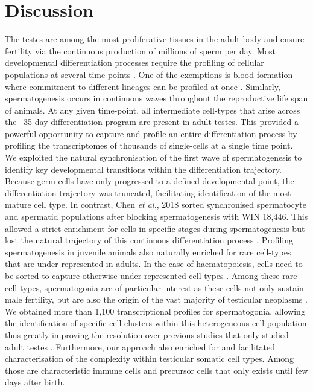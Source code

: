 
\section{Discussion}

The testes are among the most proliferative tissues in the adult body and ensure fertility via the continuous production of millions of sperm per day. Most developmental differentiation processes require the profiling of cellular populations at several time points \citep{Kernfeld2018, Scialdone2016, Wagner2018}. One of the exemptions is blood formation where commitment to different lineages can be profiled at once \citep{Dahlin2018}. Similarly, spermatogenesis occurs in continuous waves throughout the reproductive life span of animals. At any given time-point, all intermediate cell-types that arise across the ~35 day differentiation program are present in adult testes. This provided a powerful opportunity to capture and profile an entire differentiation process by profiling the transcriptomes of thousands of single-cells at a single time point. \\

We exploited the natural synchronisation of the first wave of spermatogenesis to identify key developmental transitions within the differentiation trajectory. Because germ cells have only progressed to a defined developmental point, the differentiation trajectory was truncated, facilitating identification of the most mature cell type.
In contrast, Chen \emph{et al.}, 2018 sorted synchronised spermatocyte and spermatid populations after blocking spermatogenesis with WIN 18,446. This allowed a strict enrichment for cells in specific stages during spermatogenesis but lost the natural trajectory of this continuous differentiation process \citep{Chen2018}. Profiling spermatogenesis in juvenile animals also naturally enriched for rare cell-types that are under-represented in adults. In the case of haematopoiesis, cells need to be sorted to capture otherwise under-represented cell types \citep{Dahlin2018}. Among these rare cell types, spermatogonia are of particular interest as these cells not only sustain male fertility, but are also the origin of the vast majority of testicular neoplasms \citep{Bosl1997}. We obtained more than 1,100 transcriptional profiles for spermatogonia, allowing the identification of specific cell clusters within this heterogeneous cell population thus greatly improving the resolution over previous studies that only studied adult testes \citep{Lukassen2018}. Furthermore, our approach also enriched for and facilitated characterisation of the complexity within testicular somatic cell types. Among those are characteristic immune cells and precursor cells that only exists until few days after birth.\\

